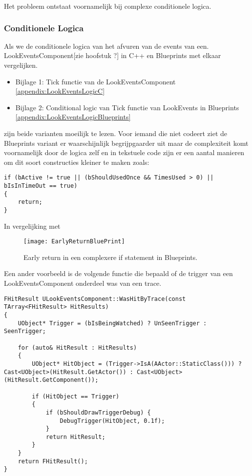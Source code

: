 Het probleem ontstaat voornamelijk bij complexe conditionele logica.

\subsubsection{Conditionele Logica}

Als we de conditionele logica van het afvuren van de events van een.
LookEventsComponent[zie hoofstuk ?] in C++ en Blueprints met elkaar vergelijken.

\begin{itemize}
	\item Bijlage 1: Tick functie van de LookEventsComponent \ref{appendix:LookEventsLogicC}
	\item Bijlage 2: Conditional logic van Tick functie van LookEvents in Blueprints \ref{appendix:LookEventsLogicBlueprints}
\end{itemize}

zijn beide varianten moeilijk te lezen. Voor iemand die niet codeert ziet de Blueprints variant er waarschijnlijk begrijpgaarder uit maar de complexiteit komt voornamelijk door de logica zelf en in tekstuele code zijn er een aantal manieren om dit soort constructies kleiner te maken zoals:

\begin{lstlisting}[caption=Early return in een complexere if statement in c++]
if (bActive != true || (bShouldUsedOnce && TimesUsed > 0) || bIsInTimeOut == true) 
{
	return;
}
\end{lstlisting}
In vergelijking met 

\begin{figure}[!ht]
  \centering
    \texttt{[image: EarlyReturnBluePrint]}
    \caption{Early return in een complexere if statement in Blueprints.}
\end{figure}

Een ander voorbeeld is de volgende functie die bepaald of de trigger van een LookEventsComponent onderdeel was van een trace.

\begin{lstlisting}[caption=Een functie die kijkt of de huidige component geraakt is door een trace]
FHitResult ULookEventsComponent::WasHitByTrace(const TArray<FHitResult> HitResults) 
{
	UObject* Trigger = (bIsBeingWatched) ? UnSeenTrigger : SeenTrigger;

	for (auto& HitResult : HitResults)
	{
		UObject* HitObject = (Trigger->IsA(AActor::StaticClass())) ? Cast<UObject>(HitResult.GetActor()) : Cast<UObject>(HitResult.GetComponent());	

		if (HitObject == Trigger)
		{
			if (bShouldDrawTriggerDebug) {
				DebugTrigger(HitObject, 0.1f);
			}
			return HitResult;
		}
	}
	return FHitResult();
}
\end{lstlisting}

